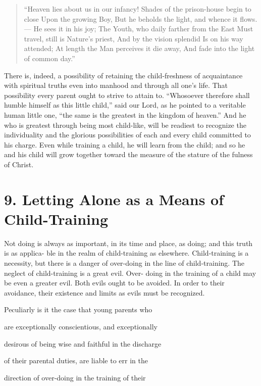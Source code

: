 \documentclass[
]{book}
\begin{document}
\begin{quote}
``Heaven lies about us in our infancy!
Shades of the prison-house begin to close
Upon the growing Boy,
But he beholds the light, and whence it flows.---
He sees it in his joy;
The Youth, who daily farther from the East
Must travel, still is Nature's priest,
And by the vision splendid
Is on his way attended;
At length the Man perceives it die away,
And fade into the light of common day.''
\end{quote}

There is, indeed, a possibility of retaining the child-freshness of acquaintance with spiritual truths even into manhood and through all one's life. That possibility every parent ought to strive to attain to. ``Whosoever therefore shall humble himself as this little child,'' said our Lord, as he pointed to a veritable human little one, ``the same is the greatest in the kingdom of heaven.'' And he who is greatest through being most child-like, will be readiest to recognize the individuality and the glorious possibilities of each and every child committed to his charge. Even while training a child, he will learn from the child; and so he and his child will grow together toward the measure of the stature of the fulness of Christ.

\hypertarget{letting-alone-as-a-means-of-child-training}{%
\chapter{9. Letting Alone as a Means of Child-Training}\label{letting-alone-as-a-means-of-child-training}}

Not doing is always as important, in its time and place, as doing; and this truth is as applica- ble in the realm of child-training as elsewhere. Child-training is a necessity, but there is a danger of over-doing in the line of child-training. The neglect of child-training is a great evil. Over- doing in the training of a child may be even a greater evil. Both evils ought to be avoided. In order to their avoidance, their existence and limits as evils must be recognized.

Peculiarly is it the case that young parents who

are exceptionally conscientious, and exceptionally

desirous of being wise and faithful in the discharge

of their parental duties, are liable to err in the

direction of over-doing in the training of their
\end{document}
